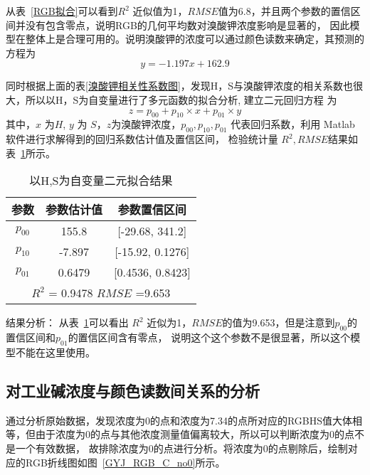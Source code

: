     从表~\ref{RGB拟合}可以看到$R^2$ 近似值为1，$RMSE$值为6.8，并且两个参数的置信区间并没有包含零点，说明RGB的几何平均数对溴酸钾浓度影响是显著的，
    因此模型在整体上是合理可用的。说明溴酸钾的浓度可以通过颜色读数来确定，其预测的方程为
    $$ y = -1.197 x + 162.9 $$

    同时根据上面的表\ref{溴酸钾相关性系数图}，发现H，S与溴酸钾浓度的相关系数也很大，所以以H，S为自变量进行了多元函数的拟合分析,
    建立二元回归方程 为
    $$ z = p_{00} + p_{10} \times x + p_{01} \times y$$
    其中，$x$ 为$H$, $y$ 为 $S$，$z$为溴酸钾浓度，$p_{00},p_{10},p_{01}$ 代表回归系数，利用 Matlab 软件进行求解得到的回归系数估计值及置信区间，
    检验统计量 $R^2, RMSE $结果如表~\ref{二元拟合结果}所示。

    \begin{table}[H]
        \centering
        \caption{以H,S为自变量二元拟合结果}
        \label{二元拟合结果}
        \begin{tabular}{@{}ccc@{}}
        \toprule
        参数         & 参数估计值     & 参数置信区间                  \\ \midrule
        $p_{00}$     & 155.8     & {[}-29.68, 341.2{]}     \\
        $p_{10}$     & -7.897    & {[}-15.92, 0.1276{]}    \\
        $p_{01}$     & 0.6479    & {[}0.4536, 0.8423{]}    \\
        \hline
        \multicolumn{3}{c}{$R^2$ = 0.9478 $RMSE$ =9.653} \\ \bottomrule
        \end{tabular}
        \end{table}

    结果分析： 从表~\ref{二元拟合结果}可以看出 $R^2$ 近似为1，$RMSE$的值为9.653，但是注意到$p_{00}$的置信区间和$p_{01}$的置信区间含有零点，
    说明这个这个参数不是很显著，所以这个模型不能在这里使用。

\subsection{对工业碱浓度与颜色读数间关系的分析}
    通过分析原始数据，发现浓度为0的点和浓度为7.34的点所对应的RGBHS值大体相等，但由于浓度为0的点与其他浓度测量值偏离较大，所以可以判断浓度为0的点不是一个有效数据，
    故排除浓度为0的点进行分析。将浓度为0的点剔除后，绘制对应的RGB折线图如图~\ref{GYJ_RGB_C_no0}所示。


